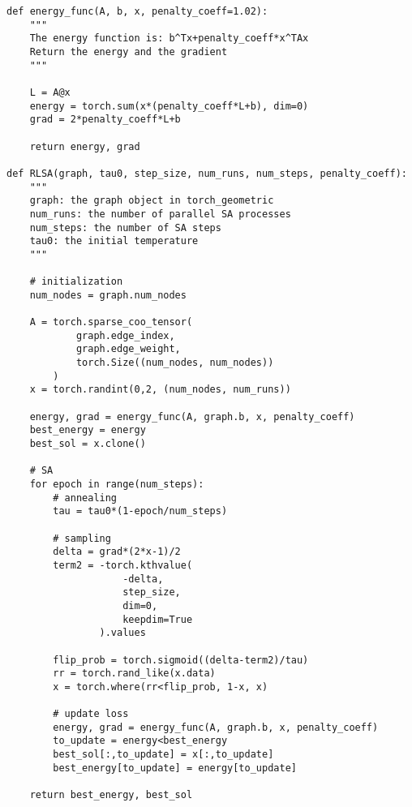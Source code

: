 \begin{lstlisting}[frame=single]
def energy_func(A, b, x, penalty_coeff=1.02):
    """
    The energy function is: b^Tx+penalty_coeff*x^TAx
    Return the energy and the gradient
    """
    
    L = A@x
    energy = torch.sum(x*(penalty_coeff*L+b), dim=0)
    grad = 2*penalty_coeff*L+b

    return energy, grad
        
def RLSA(graph, tau0, step_size, num_runs, num_steps, penalty_coeff):
    """
    graph: the graph object in torch_geometric
    num_runs: the number of parallel SA processes
    num_steps: the number of SA steps
    tau0: the initial temperature
    """

    # initialization
    num_nodes = graph.num_nodes
    
    A = torch.sparse_coo_tensor(
            graph.edge_index, 
            graph.edge_weight,
            torch.Size((num_nodes, num_nodes))
        )
    x = torch.randint(0,2, (num_nodes, num_runs))
    
    energy, grad = energy_func(A, graph.b, x, penalty_coeff)
    best_energy = energy
    best_sol = x.clone()

    # SA
    for epoch in range(num_steps):          
        # annealing
        tau = tau0*(1-epoch/num_steps)

        # sampling
        delta = grad*(2*x-1)/2
        term2 = -torch.kthvalue(
                    -delta, 
                    step_size, 
                    dim=0, 
                    keepdim=True
                ).values

        flip_prob = torch.sigmoid((delta-term2)/tau)
        rr = torch.rand_like(x.data)
        x = torch.where(rr<flip_prob, 1-x, x)

        # update loss
        energy, grad = energy_func(A, graph.b, x, penalty_coeff)
        to_update = energy<best_energy
        best_sol[:,to_update] = x[:,to_update]
        best_energy[to_update] = energy[to_update]
    
    return best_energy, best_sol
\end{lstlisting}





    